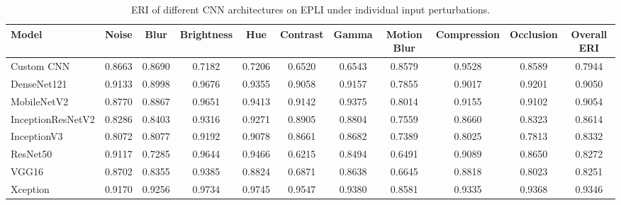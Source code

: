 \documentclass[a4paper,fleqn]{cas-dc}
\begin{document}
\begin{table}[t]
\centering
\caption{ERI of different CNN architectures on EPLI under individual input perturbations.}
\label{tab:eri_perturbation_egypli}

\scriptsize
\setlength{\tabcolsep}{4pt}
\renewcommand{\arraystretch}{1.1}

\begin{tabular}{|l|ccccccccc|c|}
\hline
\textbf{Model} &
\textbf{Noise} &
\textbf{Blur} &
\textbf{Brightness} &
\textbf{Hue} &
\textbf{Contrast} &
\textbf{Gamma} &
\textbf{Motion Blur} &
\textbf{Compression} &
\textbf{Occlusion} &
\textbf{Overall ERI}\\
\hline

Custom CNN
&0.8663&0.8690&0.7182&0.7206&0.6520&0.6543&0.8579&0.9528&0.8589&0.7944\\

DenseNet121
&0.9133&0.8998&0.9676&0.9355&0.9058&0.9157&0.7855&0.9017&0.9201&0.9050\\

MobileNetV2
&0.8770&0.8867&0.9651&0.9413&0.9142&0.9375&0.8014&0.9155&0.9102&0.9054\\

InceptionResNetV2
&0.8286&0.8403&0.9316&0.9271&0.8905&0.8804&0.7559&0.8660&0.8323&0.8614\\

InceptionV3
&0.8072&0.8077&0.9192&0.9078&0.8661&0.8682&0.7389&0.8025&0.7813&0.8332\\

ResNet50
&0.9117&0.7285&0.9644&0.9466&0.6215&0.8494&0.6491&0.9089&0.8650&0.8272\\

VGG16
&0.8702&0.8355&0.9385&0.8824&0.6871&0.8638&0.6645&0.8818&0.8023&0.8251\\

Xception
&0.9170&0.9256&0.9734&0.9745&0.9547&0.9380&0.8581&0.9335&0.9368&0.9346\\

\hline
\end{tabular}
\end{table}
\end{document}
